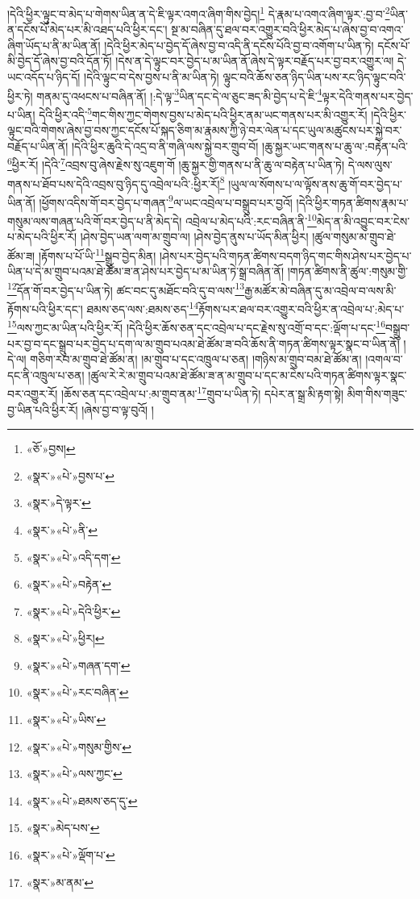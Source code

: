 །དེའི་ཕྱིར་ལྟུང་བ་མེད་པ་གེགས་ཡིན་ན་དེ་ཇི་ལྟར་འགའ་ཞིག་གིས་བྱེད།\footnote{«ཅོ་»བྱས།} དེ་རྣམ་པ་འགའ་ཞིག་ལྟར་:བྱ་བ་\footnote{«སྣར་»«པེ་»བྱས་པ་}ཡིན་ན་དངོས་པོ་མེད་པར་མི་འཐད་པའི་ཕྱིར་དང་། སྔ་མ་བཞིན་དུ་ཐལ་བར་འགྱུར་བའི་ཕྱིར་མེད་པ་ཞེས་བྱ་བ་འགའ་ཞིག་ཡོད་པ་ནི་མ་ཡིན་ནོ། །དེའི་ཕྱིར་མེད་པ་བྱེད་དོ་ཞེས་བྱ་བ་འདི་ནི་དངོས་པོའི་བྱ་བ་འགོག་པ་ཡིན་ཏེ། དངོས་པོ་མི་བྱེད་དོ་ཞེས་བྱ་བའི་དོན་ཏོ། །དེས་ན་དེ་ལྟུང་བར་བྱེད་པ་མ་ཡིན་ནོ་ཞེས་དེ་ལྟར་བརྗོད་པར་བྱ་བར་འགྱུར་ལ། དེ་ཡང་འདོད་པ་ཉིད་དོ། །དེའི་ལྟུང་བ་དེས་བྱས་པ་ནི་མ་ཡིན་ཏེ། ལྟུང་བའི་ཆོས་ཅན་ཉིད་ཡིན་པས་རང་ཉིད་ལྟུང་བའི་ཕྱིར་ཏེ། གནམ་དུ་འཕངས་པ་བཞིན་ནོ། །:དེ་ལྟ་\footnote{«སྣར་»དེ་ལྟར་}ཡིན་དང་དེ་ལ་ཅུང་ཟད་མི་བྱེད་པ་དེ་ཇི་\footnote{«སྣར་»«པེ་»ནི་}ལྟར་དེའི་གནས་པར་བྱེད་པ་ཡིན། དེའི་ཕྱིར་འདི་\footnote{«སྣར་»«པེ་»འདི་དག་}གང་གིས་ཀྱང་གེགས་བྱས་པ་མེད་པའི་ཕྱིར་ནམ་ཡང་གནས་པར་མི་འགྱུར་རོ། །དེའི་ཕྱིར་ལྟུང་བའི་གེགས་ཞེས་བྱ་བས་ཀྱང་དངོས་པོ་སྐད་ཅིག་མ་རྣམས་ཀྱི་ཉེ་བར་ལེན་པ་དང་ཡུལ་མཚུངས་པར་སྐྱེ་བར་བརྗོད་པ་ཡིན་ནོ། །དེའི་ཕྱིར་ཆུའི་དེ་འདྲ་བ་ནི་གཞི་ལས་སྐྱེ་བར་གྲུབ་བོ། །ཆུ་སྐྱར་ཡང་གནས་པ་ཆུ་ལ་:བརྟེན་པའི་\footnote{«སྣར་»«པེ་»བརྟེན་}ཕྱིར་རོ། །དེའི་\footnote{«སྣར་»«པེ་»དེའི་ཕྱིར་}འབྲས་བུ་ཞེས་རྗེས་སུ་འཇུག་གོ །ཆུ་སྐྱར་གྱི་གནས་པ་ནི་ཆུ་ལ་བརྟེན་པ་ཡིན་ཏེ། དེ་ལས་ལུས་གནས་པ་ཐོབ་པས་དེའི་འབྲས་བུ་ཉིད་དུ་འབྲེལ་པའི་:ཕྱིར་རོ།\footnote{«སྣར་»«པེ་»ཕྱིར།} །ཡུལ་ལ་སོགས་པ་ལ་ལྟོས་ནས་ཆུ་གོ་བར་བྱེད་པ་ཡིན་ནོ། །ཕྱོགས་འདིས་གོ་བར་བྱེད་པ་གཞན་\footnote{«སྣར་»«པེ་»གཞན་དག་}ལ་ཡང་འབྲེལ་པ་བསྒྲུབ་པར་བྱའོ། །དེའི་ཕྱིར་གཏན་ཚིགས་རྣམ་པ་གསུམ་ལས་གཞན་པའི་གོ་བར་བྱེད་པ་ནི་མེད་དེ། འབྲེལ་པ་མེད་པའི་:རང་བཞིན་ནི་\footnote{«སྣར་»«པེ་»རང་བཞིན་}མེད་ན་མི་འབྱུང་བར་ངེས་པ་མེད་པའི་ཕྱིར་རོ། །ཤེས་བྱེད་ཡན་ལག་མ་གྲུབ་ལ། །ཤེས་བྱེད་ནུས་པ་ཡོད་མིན་ཕྱིར། །ཚུལ་གསུམ་མ་གྲུབ་ཐེ་ཚོམ་ཟ། །རྟོགས་པ་པོ་ཡི་\footnote{«སྣར་»«པེ་»ཡིས་}སྒྲུབ་བྱེད་མིན། །ཤེས་པར་བྱེད་པའི་གཏན་ཚིགས་བདག་ཉིད་གང་གིས་ཤེས་པར་བྱེད་པ་ཡིན་པ་དེ་མ་གྲུབ་པའམ་ཐེ་ཚོམ་ཟ་ན་ཤེས་པར་བྱེད་པ་མ་ཡིན་ཏེ་སྒྲ་བཞིན་ནོ། །གཏན་ཚིགས་ནི་ཚུལ་:གསུམ་གྱི་\footnote{«སྣར་»«པེ་»གསུམ་གྱིས་}དོན་གོ་བར་བྱེད་པ་ཡིན་ཏེ། ཚང་བང་དུ་མཐོང་བའི་དུ་བ་ལས་\footnote{«སྣར་»«པེ་»ལས་ཀྱང་}རྒྱ་མཚོར་མེ་བཞིན་དུ་མ་འབྲེལ་བ་ལས་མི་རྟོགས་པའི་ཕྱིར་དང་། ཐམས་ཅད་ལས་:ཐམས་ཅད་\footnote{«སྣར་»«པེ་»ཐམས་ཅད་དུ་}རྟོགས་པར་ཐལ་བར་འགྱུར་བའི་ཕྱིར་ན་འབྲེལ་པ་:མེད་པ་\footnote{«སྣར་»མེད་པས་}ལས་ཀྱང་མ་ཡིན་པའི་ཕྱིར་རོ། །དེའི་ཕྱིར་ཆོས་ཅན་དང་འབྲེལ་པ་དང་རྗེས་སུ་འགྲོ་བ་དང་:ལྡོག་པ་དང་\footnote{«སྣར་»«པེ་»ལྡོག་པ་}བསྒྲུབ་པར་བྱ་བ་དང་སྒྲུབ་པར་བྱེད་པ་དག་ལ་མ་གྲུབ་པའམ་ཐེ་ཚོམ་ཟ་བའི་ཆོས་ནི་གཏན་ཚིགས་ལྟར་སྣང་བ་ཡིན་ནོ། །དེ་ལ། གཅིག་རབ་མ་གྲུབ་ཐེ་ཚོམ་ན། །མ་གྲུབ་པ་དང་འཁྲུལ་པ་ཅན། །གཉིས་མ་གྲུབ་བམ་ཐེ་ཚོམ་ན། །འགལ་བ་དང་ནི་འཁྲུལ་པ་ཅན། །ཚུལ་རེ་རེ་མ་གྲུབ་པའམ་ཐེ་ཚོམ་ཟ་ན་མ་གྲུབ་པ་དང་མ་ངེས་པའི་གཏན་ཚིགས་ལྟར་སྣང་བར་འགྱུར་རོ། །ཆོས་ཅན་དང་འབྲེལ་པ་:མ་གྲུབ་ནམ་\footnote{«སྣར་»མ་ནམ་}གྲུབ་པ་ཡིན་ཏེ། དཔེར་ན་སྒྲ་མི་རྟག་སྟེ། མིག་གིས་གཟུང་བྱ་ཡིན་པའི་ཕྱིར་རོ། །ཞེས་བྱ་བ་ལྟ་བུའོ། །
